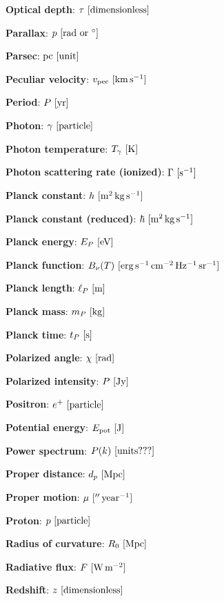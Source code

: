 \documentclass[a4paper,11pt]{article}
\begin{document}
{\noindent}\textbf{Optical depth}: $\tau ~ [{\rm dimensionless}]$

{\noindent}\textbf{Parallax}: $p ~ [{\rm rad~or~^\circ}]$

{\noindent}\textbf{Parsec}: ${\rm pc} ~ [{\rm unit}]$

{\noindent}\textbf{Peculiar velocity}: $v_{\rm pec} ~ [{\rm km\,s^{-1}}]$

{\noindent}\textbf{Period}: $P ~ [{\rm yr}]$

{\noindent}\textbf{Photon}: $\gamma ~ [{\rm particle}]$

{\noindent}\textbf{Photon temperature}: $T_\gamma ~ [{\rm K}]$

{\noindent}\textbf{Photon scattering rate (ionized)}: $\Gamma ~ [{\rm s^{-1}}]$

{\noindent}\textbf{Planck constant}: $h ~ [{\rm m^2\,kg\,s^{-1}}]$

{\noindent}\textbf{Planck constant (reduced)}: $\hbar ~ [{\rm m^2\,kg\,s^{-1}}]$

{\noindent}\textbf{Planck energy}: $E_P ~ [{\rm eV}]$

{\noindent}\textbf{Planck function}: $B_\nu(T) ~ [{\rm erg\,s^{-1}\,cm^{-2}\,Hz^{-1}\,sr^{-1}}]$

{\noindent}\textbf{Planck length}: $\ell_P ~ [{\rm m}]$

{\noindent}\textbf{Planck mass}: $m_P ~ [{\rm kg}]$

{\noindent}\textbf{Planck time}: $t_P ~ [{\rm s}]$

{\noindent}\textbf{Polarized angle}: $\chi ~ [{\rm rad}]$

{\noindent}\textbf{Polarized intensity}: $P ~ [{\rm Jy}]$

{\noindent}\textbf{Positron}: $e^+ ~ [{\rm particle}]$

{\noindent}\textbf{Potential energy}: $E_\mathrm{pot} ~ [{\rm J}]$

{\noindent}\textbf{Power spectrum}: $P(k) ~ [{\rm units???}]$

{\noindent}\textbf{Proper distance}: $d_p ~ [{\rm Mpc}]$

{\noindent}\textbf{Proper motion}: $\mu ~ [{\rm ''\,year^{-1}}]$

{\noindent}\textbf{Proton}: $p ~ [{\rm particle}]$

{\noindent}\textbf{Radius of curvature}: $R_0 ~ [{\rm Mpc}]$

{\noindent}\textbf{Radiative flux}: $F ~ [{\rm W\,m^{-2}}]$

{\noindent}\textbf{Redshift}: $z ~ [{\rm dimensionless}]$
\end{document}
